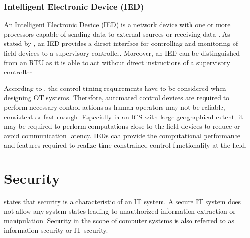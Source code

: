 \subsubsection{Intelligent Electronic Device (IED)}
An Intelligent Electronic Device (IED) is a network device with one or more processors capable of sending data to external sources or receiving data \cite{aga2006}.
As stated by \citeauthor{Stouffer2023} \cite{Stouffer2023}, an IED provides a direct interface for controlling and monitoring of field devices to a supervisory controller.
Moreover, an IED can be distinguished from an RTU as it is able to act without direct instructions of a supervisory controller.

According to \citeauthor{Stouffer2023} \cite{Stouffer2023}, the control timing requirements have to be considered when designing OT systems.
Therefore, automated control devices are required to perform necessary control actions as human operators may not be reliable, consistent or fast enough.
Especially in an ICS with large geographical extent, it may be required to perform computations close to the field devices to reduce or avoid communication latency.
IEDs can provide the computational performance and features required to realize time-constrained control functionality at the field.


\section{Security}
\label{sec:security}
\citeauthor{Eckert2023} \cite{Eckert2023} states that security is a characteristic of an IT system.
A secure IT system does not allow any system states leading to unauthorized information extraction or manipulation.
Security in the scope of computer systems is also referred to as information security or IT security.

